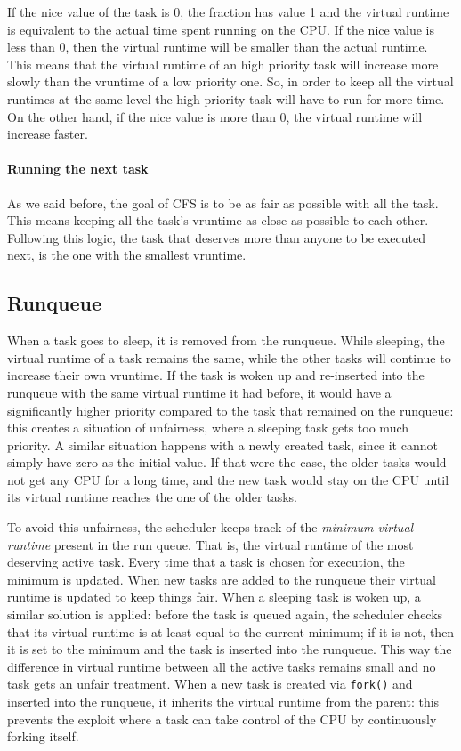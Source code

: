 If the nice value of the task is 0, the fraction has value 1 and the virtual runtime is equivalent to the actual time spent running on the CPU. If the nice value is less than 0, then the virtual runtime will be smaller than the actual runtime. This means that the virtual runtime of an high priority task will increase more slowly than the vruntime of a low priority one. So, in order to keep all the virtual runtimes at the same level the high priority task will have to run for more time. On the other hand, if the nice value is more than 0, the virtual runtime will increase faster.

\paragraph{Running the next task}

As we said before, the goal of CFS is to be as fair as possible with all the task. This means keeping all the task's vruntime as close as possible to each other. Following this logic, the task that deserves more than anyone to be executed next, is the one with the smallest vruntime.

\subsection{Runqueue}
When a task goes to sleep, it is removed from the runqueue. While sleeping, the virtual runtime of a task remains the same, while the other tasks will continue to increase their own vruntime. If the task is woken up and re-inserted into the runqueue with the same virtual runtime it had before, it would have a significantly higher priority compared to the task that remained on the runqueue: this creates a situation of unfairness, where a sleeping task gets too much priority.
A similar situation happens with a newly created task, since it cannot simply have zero as the initial value. If that were the case, the older tasks would not get any CPU for a long time, and the new task would stay on the CPU until its virtual runtime reaches the one of the older tasks.

To avoid this unfairness, the scheduler keeps track of the \textit{minimum virtual runtime} present in the run queue. That is, the virtual runtime of the most deserving active task. Every time that a task is chosen for execution, the minimum is updated. When new tasks are added to the runqueue their virtual runtime is updated to keep things fair. When a sleeping task is woken up, a similar solution is applied: before the task is queued again, the scheduler checks that its virtual runtime is at least equal to the current minimum; if it is not, then it is set to the minimum and the task is inserted into the runqueue. This way the difference in virtual runtime between all the active tasks remains small and no task gets an unfair treatment. When a new task is created via \verb|fork()| and inserted into the runqueue, it inherits the virtual runtime from the parent: this prevents the exploit where a task can take control of the CPU by continuously forking itself.

